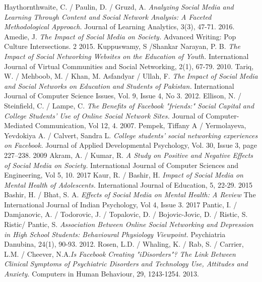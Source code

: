 \documentclass[lettersize,journal]{IEEEtran}
\begin{document}
\begin{thebibliography}{}
    Haythornthwaite, C. / Paulin, D. / Gruzd, A. {\it{Analyzing Social Media
        and Learning Through Content and Social Network Analysis: A Faceted
        Methodological Approach.}} Journal of Learning Analytics, 3(3), 47-71.
        2016.
        Amedie, J. {\it{The Impact of Social Media on Society.}}
        Advanced Writing: Pop Culture Intersections. 2
        2015.
	Kuppuswamy, S /Shankar Narayan, P. B. {\it{The Impact of Social Networking Websites on the Education of Youth.}}
	International Journal of Virtual Communities and Social Networking, 2(1), 67-79.
	2010.
	Tariq, W. / Mehboob, M. / Khan, M. Asfandyar / Ullah, F. {\it{The Impact of Social Media and Social Networks on Education and Students of Pakistan.}} International Journal of Computer Science Issues, Vol. 9, Issue 4, No 3.
	2012.
	Ellison, N. / Steinfield, C. / Lampe, C. {\it{The Benefits of Facebook "friends:" Social Capital and College Students' Use of Online Social Network Sites.}} Journal of Computer-Mediated Communication, Vol 12, 4.
	2007.
	Pempek, Tiffany A / Yermolayeva, Yevdokiya A. / Calvert, Sandra L. {\it{College students’ social networking experiences on
		Facebook.}} Journal of Applied Developmental Psychology, Vol. 30, Issue 3, page 227–238.
	2009
	Akram, A. / Kumar, R. {\it{A Study on Positive and Negative Effects of Social Media on Society.}}
	International Journal of Computer Sciences and Engineering, Vol 5, 10.
	2017
	Kaur, R. / Bashir, H. {\it{Impact of Social Media on Mental Health of Adolescents.}}
	International Journal of Education, 5, 22-29.
	2015
	Bashir, H. / Bhat, S. A. {\it{Effects of Social Media on Mental Health: A Review}}
	The International Journal of Indian Psychology, Vol 4, Issue 3.
	2017
	Pantic, I. / Damjanovic, A. / Todorovic, J. / Topalovic, D. / Bojovic-Jovic, D. / Ristic, S. Ristic/ Pantic, S.
	{\it{Association Between Online Social Networking and Depression in High School Students: Behavioural Physiology Viewpoint.}}
	Psychiatria Danubina, 24(1), 90-93.
	2012.
	Rosen, L.D. / Whaling, K. / Rab, S. / Carrier, L.M. / Cheever, N.A.{\it{Is Facebook Creating "iDisorders"? The Link Between Clinical Symptoms of Psychiatric Disorders and Technology Use, Attitudes and Anxiety.}} Computers in Human Behaviour, 29, 1243-1254.
	2013.

\end{thebibliography}
\end{document}
